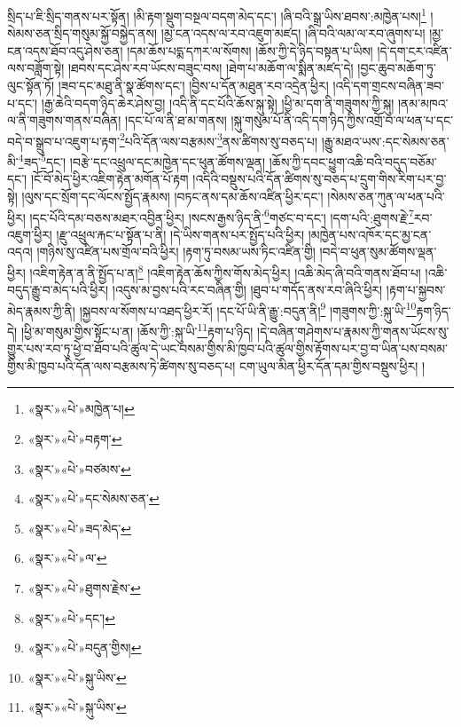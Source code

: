 སྲིད་པ་ཇི་སྲིད་གནས་པར་སྟོན། །མི་རྟག་སྡུག་བསྔལ་བདག་མེད་དང་། །ཞི་བའི་སྒྲ་ཡིས་ཐབས་:མཁྱེན་པས།\footnote{«སྣར་»«པེ་»མཁྱེན་པ།} །སེམས་ཅན་སྲིད་གསུམ་སྐྱོ་བསྐྱེད་ནས། །མྱ་ངན་འདས་ལ་རབ་འཇུག་མཛད། །ཞི་བའི་ལམ་ལ་རབ་ཞུགས་པ། །མྱ་ངན་འདས་ཐོབ་འདུ་ཤེས་ཅན། །དམ་ཆོས་པདྨ་དཀར་ལ་སོགས། །ཆོས་ཀྱི་དེ་ཉིད་བསྟན་པ་ཡིས། །དེ་དག་ངར་འཛིན་ལས་བཟློག་སྟེ། །ཐབས་དང་ཤེས་རབ་ཡོངས་བཟུང་བས། །ཐེག་པ་མཆོག་ལ་སྨིན་མཛད་དེ། །བྱང་ཆུབ་མཆོག་ཏུ་ལུང་སྟོན་ཏོ། །ཟབ་དང་མཐུ་ནི་སྣ་ཚོགས་དང་། །བྱིས་པ་དོན་མཐུན་རབ་འདྲེན་ཕྱིར། །འདི་དག་གྲངས་བཞིན་ཟབ་པ་དང་། །རྒྱ་ཆེའི་བདག་ཉིད་ཆེར་ཤེས་བྱ། །འདི་ནི་དང་པོའི་ཆོས་སྐུ་སྟེ། །ཕྱི་མ་དག་ནི་གཟུགས་ཀྱི་སྐུ། །ནམ་མཁའ་ལ་ནི་གཟུགས་གནས་བཞིན། །དང་པོ་ལ་ནི་ཐ་མ་གནས། །སྐུ་གསུམ་པོ་ནི་འདི་དག་ཉིད་ཀྱིས་འགྲོ་བ་ལ་ཕན་པ་དང་བདེ་བ་སྒྲུབ་པ་འཇུག་པ་རྟག་\footnote{«སྣར་»«པེ་»བརྟག་}པའི་དོན་ལས་བརྩམས་\footnote{«སྣར་»«པེ་»བཙམས་}ནས་ཚིགས་སུ་བཅད་པ། །རྒྱུ་མཐའ་ཡས་:དང་སེམས་ཅན་མི་\footnote{«སྣར་»«པེ་»དང་སེམས་ཅན་}ཟད་\footnote{«སྣར་»«པེ་»ཟད་མེད་}དང་། །བརྩེ་དང་འཕྲུལ་དང་མཁྱེན་དང་ཕུན་ཚོགས་ལྡན། །ཆོས་ཀྱི་དབང་ཕྱུག་འཆི་བའི་བདུད་བཅོམ་དང་། །ངོ་བོ་མེད་ཕྱིར་འཇིག་རྟེན་མགོན་པོ་རྟག །འདིའི་བསྡུས་པའི་དོན་ཚིགས་སུ་བཅད་པ་དྲུག་གིས་རིག་པར་བྱ་སྟེ། །ལུས་དང་སྲོག་དང་ལོངས་སྤྱོད་རྣམས། །བཏང་ནས་དམ་ཆོས་འཛིན་ཕྱིར་དང་། །སེམས་ཅན་ཀུན་ལ་ཕན་པའི་ཕྱིར། །དང་པོའི་དམ་བཅས་མཐར་འབྱིན་ཕྱིར། །སངས་རྒྱས་ཉིད་ནི་\footnote{«སྣར་»«པེ་»ལ་}གཙང་བ་དང་། །དག་པའི་:ཐུགས་རྗེ་\footnote{«སྣར་»«པེ་»ཐུགས་རྗེས་}རབ་འཇུག་ཕྱིར། །རྫུ་འཕྲུལ་རྐང་པ་སྟོན་པ་ནི། །དེ་ཡིས་གནས་པར་སྤྱོད་པའི་ཕྱིར། །མཁྱེན་པས་འཁོར་དང་མྱ་ངན་འདའ། །གཉིས་སུ་འཛིན་པས་གྲོལ་བའི་ཕྱིར། །རྟག་ཏུ་བསམ་ཡས་ཏིང་འཛིན་གྱི། །བདེ་བ་ཕུན་སུམ་ཚོགས་ལྡན་ཕྱིར། །འཇིག་རྟེན་ན་ནི་སྤྱོད་པ་ན།\footnote{«སྣར་»«པེ་»དང་།} །འཇིག་རྟེན་ཆོས་ཀྱིས་གོས་མེད་ཕྱིར། །འཆི་མེད་ཞི་བའི་གནས་ཐོབ་པ། །འཆི་བདུད་རྒྱུ་བ་མེད་པའི་ཕྱིར། །འདུས་མ་བྱས་པའི་རང་བཞིན་གྱི། །ཐུབ་པ་གདོད་ནས་རབ་ཞིའི་ཕྱིར། །རྟག་པ་སྐྱབས་མེད་རྣམས་ཀྱི་ནི། །སྐྱབས་ལ་སོགས་པ་འཐད་ཕྱིར་རོ། །དང་པོ་ཡི་ནི་རྒྱུ་:བདུན་ནི།\footnote{«སྣར་»«པེ་»བདུན་གྱིས།} །གཟུགས་ཀྱི་:སྐུ་ཡི་\footnote{«སྣར་»«པེ་»སྐུ་ཡིས་}རྟག་ཉིད་དེ། །ཕྱི་མ་གསུམ་གྱིས་སྟོང་པ་ན། །ཆོས་ཀྱི་:སྐུ་ཡི་\footnote{«སྣར་»«པེ་»སྐུ་ཡིས་}རྟག་པ་ཉིད། །དེ་བཞིན་གཤེགས་པ་རྣམས་ཀྱི་གནས་ཡོངས་སུ་གྱུར་པས་རབ་ཏུ་ཕྱེ་བ་ཐོབ་པའི་ཚུལ་དེ་ཡང་བསམ་གྱིས་མི་ཁྱབ་པའི་ཚུལ་གྱིས་རྟོགས་པར་བྱ་བ་ཡིན་པས་བསམ་གྱིས་མི་ཁྱབ་པའི་དོན་ལས་བརྩམས་ཏེ་ཚིགས་སུ་བཅད་པ། ངག་ཡུལ་མིན་ཕྱིར་དོན་དམ་གྱིས་བསྡུས་ཕྱིར། །
